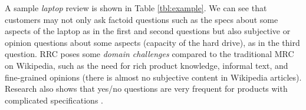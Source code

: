 \documentclass[11pt,a4paper]{article}
\begin{document}
\label{sec:intro}
\begin{table}
    \centering
	\caption{An example of review reading comprehension: we show 3 questions and their corresponding answer spans from a review.}
    \label{tbl:example}
\end{table}

A sample \emph{laptop} review is shown in Table \ref{tbl:example}. 
We can see that customers may not only ask factoid questions such as the specs about some aspects of the laptop as in the first and second questions but also subjective or opinion questions about some aspects (capacity of the hard drive), as in the third question.
RRC poses some \textit{domain challenges} compared to the traditional MRC on Wikipedia, such as the need for rich product knowledge, informal text, and fine-grained opinions (there is almost no subjective content in Wikipedia articles). Research also shows that yes/no questions are very frequent for products with complicated specifications \cite{mcauley2016addressing,Xu2018pro}.
\end{document}
